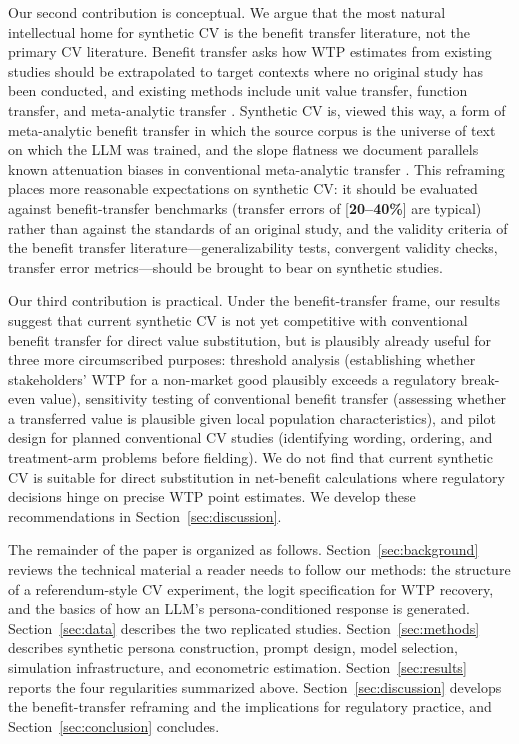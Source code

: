 \documentclass[12pt]{article}
\begin{document}
Our second contribution is conceptual. We argue that the most natural
intellectual home for synthetic CV is the benefit transfer literature, not
the primary CV literature. Benefit transfer asks how WTP estimates from
existing studies should be extrapolated to target contexts where no original
study has been conducted, and existing methods include unit value transfer,
function transfer, and meta-analytic transfer
\parencite{Rosenberger2017, Loomis2015, Boyle2010}. Synthetic CV is, viewed
this way, a form of meta-analytic benefit transfer in which the source
corpus is the universe of text on which the LLM was trained, and the slope
flatness we document parallels known attenuation biases in conventional
meta-analytic transfer \parencite{Bergstrom2008}. This reframing places more
reasonable expectations on synthetic CV: it should be evaluated against
benefit-transfer benchmarks (transfer errors of [\textbf{20--40\%}] are
typical) rather than against the standards of an original study, and the
validity criteria of the benefit transfer literature---generalizability
tests, convergent validity checks, transfer error metrics---should be
brought to bear on synthetic studies.

Our third contribution is practical. Under the benefit-transfer frame, our
results suggest that current synthetic CV is not yet competitive with
conventional benefit transfer for direct value substitution, but is
plausibly already useful for three more circumscribed purposes: threshold
analysis (establishing whether stakeholders' WTP for a non-market good
plausibly exceeds a regulatory break-even value), sensitivity testing of
conventional benefit transfer (assessing whether a transferred value is
plausible given local population characteristics), and pilot design for
planned conventional CV studies (identifying wording, ordering, and
treatment-arm problems before fielding). We do not find that current
synthetic CV is suitable for direct substitution in net-benefit calculations
where regulatory decisions hinge on precise WTP point estimates. We develop
these recommendations in Section~\ref{sec:discussion}.

The remainder of the paper is organized as follows.
Section~\ref{sec:background} reviews the technical material a reader needs
to follow our methods: the structure of a referendum-style CV experiment,
the logit specification for WTP recovery, and the basics of how an LLM's
persona-conditioned response is generated. Section~\ref{sec:data} describes
the two replicated studies. Section~\ref{sec:methods} describes synthetic
persona construction, prompt design, model selection, simulation
infrastructure, and econometric estimation. Section~\ref{sec:results}
reports the four regularities summarized above. Section~\ref{sec:discussion}
develops the benefit-transfer reframing and the implications for regulatory
practice, and Section~\ref{sec:conclusion} concludes.
\end{document}
